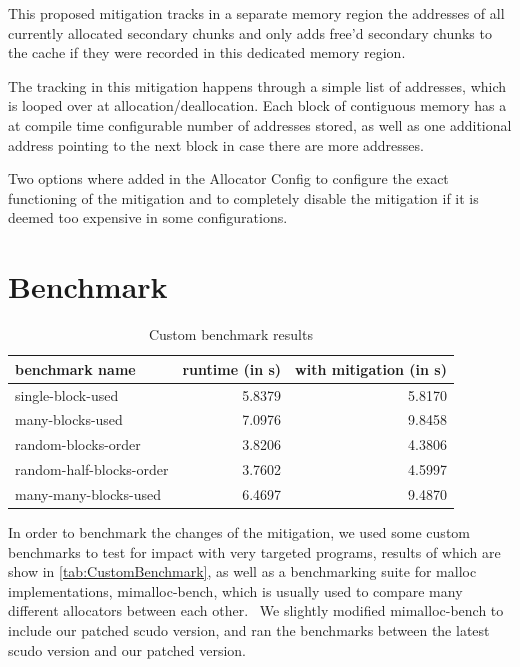 \documentclass[a4paper,11pt,oneside]{report}
\begin{document}
This proposed mitigation tracks in a separate memory region the addresses of all currently
allocated secondary chunks and only adds free'd secondary chunks to the cache if they were
recorded in this dedicated memory region.

The tracking in this mitigation happens through a simple list of addresses, which is
looped over at allocation/deallocation. Each block of contiguous memory has a at compile
time configurable number of addresses stored, as well as one additional address pointing
to the next block in case there are more addresses.

Two options where added in the Allocator Config to configure the exact functioning of the
mitigation and to completely disable the mitigation if it is deemed too expensive in some
configurations.

\section{Benchmark}

\begin{longtable}[h]{l r r}
  \caption{Custom benchmark results}\label{tab:CustomBenchmark} \\
  
  \toprule
  benchmark name           & runtime (in s) & with mitigation (in s) \\
  \midrule
  \endhead{}
  single-block-used        & 5.8379         & 5.8170                 \\
  \midrule
  many-blocks-used         & 7.0976         & 9.8458                 \\
  \midrule
  random-blocks-order      & 3.8206         & 4.3806                 \\
  \midrule
  random-half-blocks-order & 3.7602         & 4.5997                 \\
  \midrule
  many-many-blocks-used    & 6.4697         & 9.4870                 \\
  \bottomrule
\end{longtable}

In order to benchmark the changes of the mitigation, we used some custom benchmarks to
test for impact with very targeted programs, results of which are show in
\autoref{tab:CustomBenchmark}, as well as a benchmarking suite for malloc implementations,
mimalloc-bench, which is usually used to compare many different allocators between each
other.~\cite{mimalloc-bench} We slightly modified mimalloc-bench to include our patched
scudo version, and ran the benchmarks between the latest scudo version and our patched
version.
\end{document}
